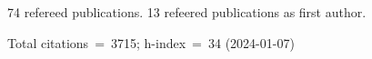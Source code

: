 74 refereed publications. 13 refeered publications as first author.

Total citations~=~3715; h-index~=~34 (2024-01-07)